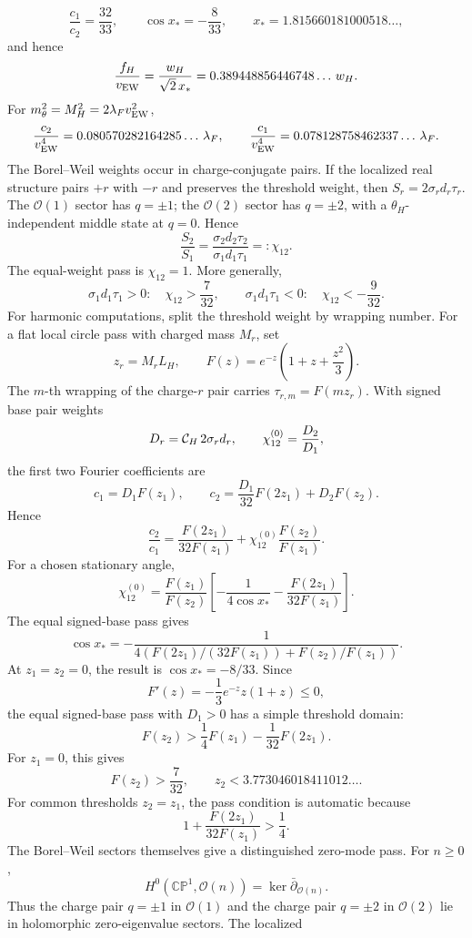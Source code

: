 \documentclass[11pt]{article}
\theoremstyle{definition}
\theoremstyle{remark}
\newcommand{\CP}{\mathbb{CP}}
\newcommand{\cO}{\mathcal O}
\begin{document}
\[
  \frac{c_1}{c_2}=\frac{32}{33},
  \qquad
  \cos x_*=-\frac{8}{33},
  \qquad
  x_*=1.815660181000518\ldots ,
\]
and hence
\[
  \frac{f_H}{v_{\rm EW}}
  =
  \frac{w_H}{\sqrt2\,x_*}
  =
  0.389448856446748\ldots\, w_H .
\]
For \(m_\theta^2=M_H^2=2\lambda_Fv_{\rm EW}^2\),
\[
  \frac{c_2}{v_{\rm EW}^4}
  =
  0.080570282164285\ldots\,\lambda_F,
  \qquad
  \frac{c_1}{v_{\rm EW}^4}
  =
  0.078128758462337\ldots\,\lambda_F .
\]
The Borel--Weil weights occur in charge-conjugate pairs.  If the localized
real structure pairs \(+r\) with \(-r\) and preserves the threshold weight,
then \(S_r=2\sigma_rd_r\tau_r\).  The \(\cO(1)\) sector has \(q=\pm1\); the
\(\cO(2)\) sector has \(q=\pm2\), with a \(\theta_H\)-independent middle
state at \(q=0\).  Hence
\[
  \frac{S_2}{S_1}
  =
  \frac{\sigma_2d_2\tau_2}{\sigma_1d_1\tau_1}
  =:\chi_{12}.
\]
The equal-weight pass is \(\chi_{12}=1\).  More generally,
\[
  \sigma_1d_1\tau_1>0:\quad \chi_{12}>\frac{7}{32},
  \qquad
  \sigma_1d_1\tau_1<0:\quad \chi_{12}<-\frac{9}{32}.
\]
For harmonic computations, split the threshold weight by wrapping number.
For a flat local circle pass with charged mass \(M_r\), set
\[
  z_r=M_rL_H,
  \qquad
  F(z)=e^{-z}\left(1+z+\frac{z^2}{3}\right).
\]
The \(m\)-th wrapping of the charge-\(r\) pair carries
\(\tau_{r,m}=F(mz_r)\).  With signed base pair weights
\[
  D_r={\cal C}_H\,2\sigma_rd_r,
  \qquad
  \chi_{12}^{(0)}=\frac{D_2}{D_1},
\]
the first two Fourier coefficients are
\[
  c_1=D_1F(z_1),
  \qquad
  c_2=\frac{D_1}{32}F(2z_1)+D_2F(z_2).
\]
Hence
\[
  \frac{c_2}{c_1}
  =
  \frac{F(2z_1)}{32F(z_1)}
  +
  \chi_{12}^{(0)}\frac{F(z_2)}{F(z_1)}.
\]
For a chosen stationary angle,
\[
  \chi_{12}^{(0)}
  =
  \frac{F(z_1)}{F(z_2)}
  \left[
  -\frac{1}{4\cos x_*}
  -
  \frac{F(2z_1)}{32F(z_1)}
  \right].
\]
The equal signed-base pass gives
\[
  \cos x_*=
  -\frac{1}{4\left(
  F(2z_1)/(32F(z_1))+F(z_2)/F(z_1)
  \right)}.
\]
At \(z_1=z_2=0\), the result is \(\cos x_*=-8/33\).
Since
\[
  F'(z)=-\frac13 e^{-z}z(1+z)\le0,
\]
the equal signed-base pass with \(D_1>0\) has a simple threshold domain:
\[
  F(z_2)>\frac14F(z_1)-\frac1{32}F(2z_1).
\]
For \(z_1=0\), this gives
\[
  F(z_2)>\frac{7}{32},
  \qquad
  z_2<3.773046018411012\ldots .
\]
For common thresholds \(z_2=z_1\), the pass condition is automatic because
\[
  1+\frac{F(2z_1)}{32F(z_1)}>\frac14 .
\]
The Borel--Weil sectors themselves give a distinguished zero-mode pass.  For
\(n\ge0\),
\[
  H^0(\CP^1,\cO(n))=\ker\bar\partial_{\cO(n)}.
\]
Thus the charge pair \(q=\pm1\) in \(\cO(1)\) and the charge pair \(q=\pm2\)
in \(\cO(2)\) lie in holomorphic zero-eigenvalue sectors.  The localized
\end{document}
